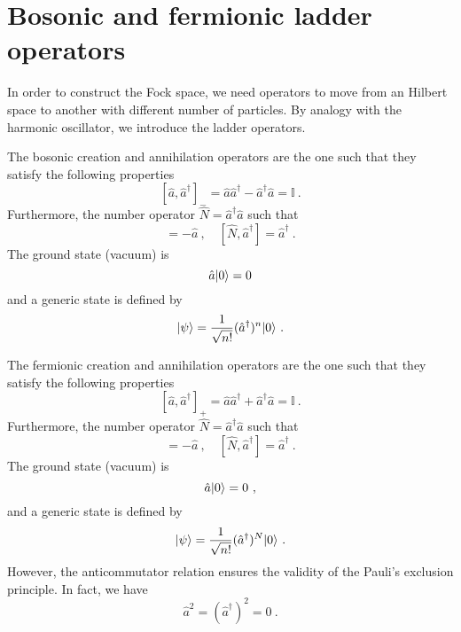 \section{Bosonic and fermionic ladder operators}

    In order to construct the Fock space, we need operators to move from an Hilbert space to another with different number of particles. By analogy with the harmonic oscillator, we introduce the ladder operators. 

    The bosonic creation and annihilation operators are the one such that they satisfy the following properties 
    \begin{equation}\label{bos}
        [\hat a, \hat a^\dagger]_- = \hat a \hat a^\dagger - \hat a^\dagger \hat a = \mathbb I~.
    \end{equation}
    Furthermore, the number operator $\hat N = \hat a^\dagger \hat a$ such that 
    \begin{equation*}
        [\hat N, \hat a] = - \hat a~, \quad [\hat N, \hat a^\dagger] = \hat a^\dagger ~.
    \end{equation*} 
    The ground state (vacuum) is 
    \begin{equation*}
        \hat a \vert0\rangle = 0
    \end{equation*}
    and a generic state is defined by
    \begin{equation*}
        \vert\psi\rangle = \frac{1}{\sqrt{n!}} (\hat a^\dagger)^n \vert0\rangle ~.
    \end{equation*}

    The fermionic creation and annihilation operators are the one such that they satisfy the following properties 
    \begin{equation}\label{ferm}
        [\hat a, \hat a^\dagger]_+ = \hat a \hat a^\dagger + \hat a^\dagger \hat a = \mathbb I ~.
    \end{equation}
    Furthermore, the number operator $\hat N = \hat a^\dagger \hat a$ such that 
    \begin{equation*}
        [\hat N, \hat a] = - \hat a~, \quad [\hat N, \hat a^\dagger] = \hat a^\dagger ~.
    \end{equation*} 
    The ground state (vacuum) is
    \begin{equation*}
        \hat a \vert0\rangle = 0 ~,
    \end{equation*}
    and a generic state is defined by
    \begin{equation*}
        \vert\psi\rangle = \frac{1}{\sqrt{n!}} (\hat a^\dagger)^N \vert0\rangle ~.
    \end{equation*}
    However, the anticommutator relation ensures the validity of the Pauli's exclusion principle. In fact, we have 
    \begin{equation*}
        \hat a^2 = (\hat a^\dagger)^2 = 0 ~.
    \end{equation*}

